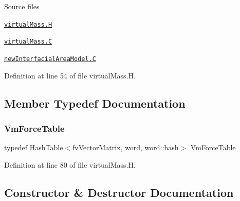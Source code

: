 \begin{DoxyParagraph}{Source files}

\begin{DoxyItemize}
\item \href{../../../home/carlo/data/GeN-Foam/GeN-Foam_ffn/GeN-Foam/GeN-Foam/classes/thermalHydraulics/src/physicsModels/virtualMassModels/virtualMass.H}{\tt virtual\+Mass.\+H} 
\item \href{../../../home/carlo/data/GeN-Foam/GeN-Foam_ffn/GeN-Foam/GeN-Foam/classes/thermalHydraulics/src/physicsModels/virtualMassModels/virtualMass.C}{\tt virtual\+Mass.\+C} 
\item \href{../../../home/carlo/data/GeN-Foam/GeN-Foam_ffn/GeN-Foam/GeN-Foam/classes/thermalHydraulics/src/physicsModels/virtualMassModels/newInterfacialAreaModel.C}{\tt new\+Interfacial\+Area\+Model.\+C} 
\end{DoxyItemize}
\end{DoxyParagraph}


Definition at line 54 of file virtual\+Mass.\+H.



\subsection{Member Typedef Documentation}
\mbox{\label{classFoam_1_1virtualMass_af57d3dff5978a5ef9bc2df99473ebc19}} 
\subsubsection{\texorpdfstring{Vm\+Force\+Table}{VmForceTable}}
{\footnotesize\ttfamily typedef Hash\+Table$<$fv\+Vector\+Matrix, word, word\+::hash$>$ \hyperlink{classFoam_1_1virtualMass_af57d3dff5978a5ef9bc2df99473ebc19}{Vm\+Force\+Table}\hspace{0.3cm}{\ttfamily [protected]}}



Definition at line 80 of file virtual\+Mass.\+H.



\subsection{Constructor \& Destructor Documentation}
\mbox{\label{classFoam_1_1virtualMass_ad09aaf54e6fd94f8638c137e1d21d46d}} 
